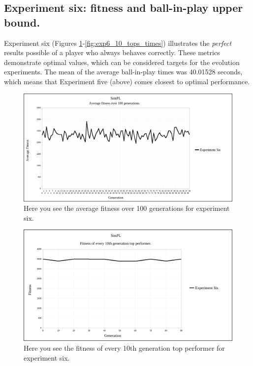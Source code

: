 \documentclass[a4paper,10pt]{article}
\begin{document}
\subsection{Experiment six: fitness and ball-in-play upper bound.}

Experiment six (Figures \ref{fig:exp6_avg_fit}-\ref{fig:exp6_10_tops_times}) illustrates the \textit{perfect} results possible of a player who always behaves correctly. These metrics demonstrate optimal values, which can be considered targets for the evolution experiments. The mean of the average ball-in-play times was 40.01528 seconds, which means that Experiment five (above) comes closest to optimal performance.

\begin{figure}[H]  
  \centering
  \includegraphics[width=1\textwidth]{figures/exp6_avg_fit.png}
  \caption{Here you see the average fitness over 100 generations for experiment six.}
  \label{fig:exp6_avg_fit}
\end{figure}

\begin{figure}[H]  
  \centering
  \includegraphics[width=1\textwidth]{figures/exp6_10_tops.png}
  \caption{Here you see the fitness of every 10th generation top performer for experiment six.}
  \label{fig:exp6_10_tops}
\end{figure}
\end{document}
